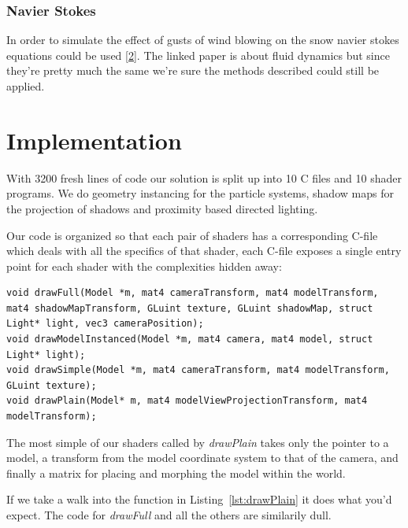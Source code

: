 \documentclass[a4paper,12pt]{article}
\begin{document}
\subsubsection{Navier Stokes}

In order to simulate the effect of gusts of wind blowing on the snow navier stokes equations could be used \href{http://www.intpowertechcorp.com/GDC03.pdf}{[2]}. The linked paper is about fluid dynamics but since they're pretty much the same we're sure the methods described could still be applied.




\section{Implementation}

With 3200 fresh lines of code our solution is split up into 10 C files and 10 shader programs. We do geometry instancing for the particle systems, shadow maps for the projection of shadows and proximity based directed lighting.

Our code is organized so that each pair of shaders has a corresponding C-file which deals with all the specifics of that shader, each C-file exposes a single entry point for each shader with the complexities hidden away:

\begin{lstlisting}[label=lst:entry-points,caption= The entry points of each shader pair\, listed in decreasing complexity.]
void drawFull(Model *m, mat4 cameraTransform, mat4 modelTransform, mat4 shadowMapTransform, GLuint texture, GLuint shadowMap, struct Light* light, vec3 cameraPosition);
void drawModelInstanced(Model *m, mat4 camera, mat4 model, struct Light* light);
void drawSimple(Model *m, mat4 cameraTransform, mat4 modelTransform, GLuint texture);
void drawPlain(Model* m, mat4 modelViewProjectionTransform, mat4 modelTransform);
\end{lstlisting}

The most simple of our shaders called by \emph{drawPlain} takes only the pointer to a model, a transform from the model coordinate system to that of the camera, and finally a matrix for placing and morphing the model within the world.

If we take a walk into the function in Listing~\ref{lst:drawPlain} it does what you'd expect. The code for \emph{drawFull} and all the others are similarily dull.
\end{document}
